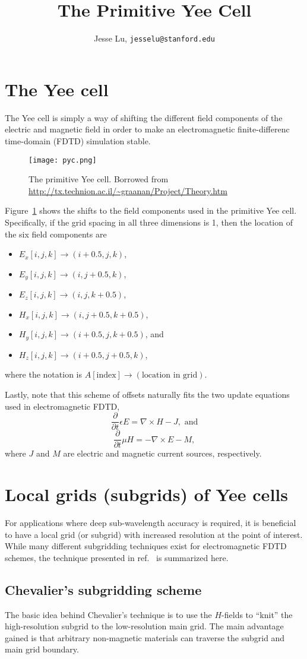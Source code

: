 \documentclass{article}
\title{The Primitive Yee Cell}
\author{Jesse Lu, \texttt{jesselu@stanford.edu}}
\newcommand{\be}{\begin{equation}}
\newcommand{\ee}{\end{equation}}
\newcommand{\curl}{\nabla\times}
\newcommand{\eps}{\epsilon}
\newcommand{\del}{\partial}
\newcommand{\dt}{\frac{\del}{\del t}}
\newcommand{\BI}{\begin{itemize}}
\newcommand{\I}{\item}
\newcommand{\EI}{\end{itemize}}
\begin{document}
\maketitle
\tableofcontents

\section{The Yee cell}
The Yee cell\cite{yee} is simply a way of shifting the different field components of the electric and magnetic field in order to make an electromagnetic finite-differenc time-domain (FDTD) simulation stable.

\begin{figure}[hbt]
\centering\texttt{[image: pyc.png]}
\caption{The primitive Yee cell. Borrowed from \url{http://tx.technion.ac.il/~graanan/Project/Theory.htm}}\label{pyc}
\end{figure}

Figure~\ref{pyc} shows the shifts to the field components used in the primitive Yee cell. Specifically, if the grid spacing in all three dimensions is 1, then the location of the six field components are
\BI
\I $E_x[i,j,k] \to (i+0.5,j,k)$,
\I $E_y[i,j,k] \to (i, j+0.5,k)$,
\I $E_z[i,j,k] \to (i, j, k+0.5)$,
\I $H_x[i,j,k] \to (i,j+0.5,k+0.5)$,
\I $H_y[i,j,k] \to (i+0.5,j,k+0.5)$, and
\I $H_z[i,j,k] \to (i+0.5,j+0.5,k)$,
\EI
where the notation is $A[\text{index}] \to (\text{location in grid})$.

Lastly, note that this scheme of offsets naturally fits the two update equations used in electromagnetic FDTD\cite{TH}, 
\be \dt \eps E = \curl H - J, \text{ and} \ee
\be \dt \mu H = -\curl E - M,\ee
where $J$ and $M$ are electric and magnetic current sources, respectively.


\section{Local grids (subgrids) of Yee cells}
For applications where deep sub-wavelength accuracy is required, it is beneficial to have a local grid (or subgrid) with increased resolution at the point of interest. While many different subgridding techniques exist for electromagnetic FDTD schemes, the technique presented in ref.~\cite{CLC} is summarized here.

\subsection{Chevalier's subgridding scheme}
The basic idea behind Chevalier's technique\cite{CLC} is to use the $H$-fields to ``knit'' the high-resolution subgrid to the low-resolution main grid. The main advantage gained is that arbitrary non-magnetic materials can traverse the subgrid and main grid boundary.
\end{document}
